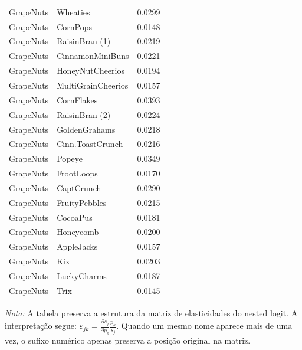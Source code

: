 \begin{table}[H]
\begin{tabular}{llr}
GrapeNuts & Wheaties & 0.0299 \\
GrapeNuts & CornPops & 0.0148 \\
GrapeNuts & RaisinBran (1) & 0.0219 \\
GrapeNuts & CinnamonMiniBuns & 0.0221 \\
GrapeNuts & HoneyNutCheerios & 0.0194 \\
GrapeNuts & MultiGrainCheerios & 0.0157 \\
GrapeNuts & CornFlakes & 0.0393 \\
GrapeNuts & RaisinBran (2) & 0.0224 \\
GrapeNuts & GoldenGrahams & 0.0218 \\
GrapeNuts & Cinn.ToastCrunch & 0.0216 \\
GrapeNuts & Popeye & 0.0349 \\
GrapeNuts & FrootLoops & 0.0170 \\
GrapeNuts & CaptCrunch & 0.0290 \\
GrapeNuts & FruityPebbles & 0.0215 \\
GrapeNuts & CocoaPus & 0.0181 \\
GrapeNuts & Honeycomb & 0.0200 \\
GrapeNuts & AppleJacks & 0.0157 \\
GrapeNuts & Kix & 0.0203 \\
GrapeNuts & LuckyCharms & 0.0187 \\
GrapeNuts & Trix & 0.0145 \\
\bottomrule
\end{tabular}

\vspace{0.3em}
\footnotesize
\textit{Nota:} A tabela preserva a estrutura da matriz de elasticidades do nested logit. A interpretação segue: $\varepsilon_{jk}=\frac{\partial s_j}{\partial p_k}\frac{p_k}{s_j}$. Quando um mesmo nome aparece mais de uma vez, o sufixo numérico apenas preserva a posição original na matriz.
\end{table}
\endgroup



